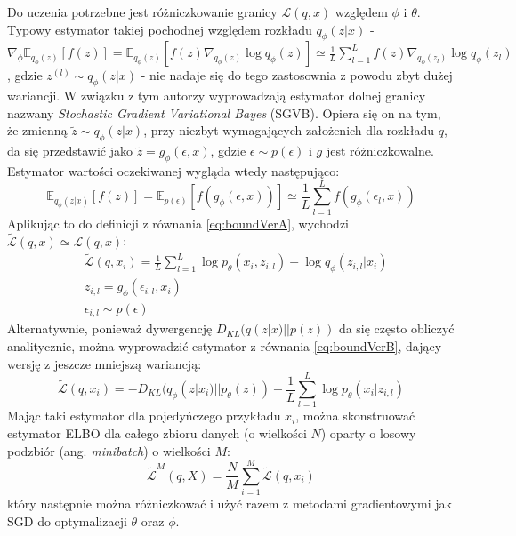 \documentclass[magisterska]{pracamgr}
\begin{document}
Do uczenia potrzebne jest różniczkowanie granicy $\mathcal{L}(q, x)$ względem $\phi$ i $\theta$. Typowy estymator takiej pochodnej względem rozkładu $q_{\phi}(z|x)$ - $\nabla_{\phi} \mathbb{E}_{q_{\phi}(z)}[f(z)] = \mathbb{E}_{q_{\phi}(z)}[f(z) \nabla_{q_{\phi}(z)} \log q_{\phi}(z)] \simeq \frac{1}{L} \sum_{l=1}^{L} f(z) \nabla_{q_{\phi}(z_l)} \log q_{\phi}(z_l)$, gdzie $z^{(l)} \sim q_{\phi}(z|x)$ - nie nadaje się do tego zastosownia z powodu zbyt dużej wariancji. W związku z tym autorzy wyprowadzają estymator dolnej granicy nazwany \textit{Stochastic Gradient Variational Bayes} (SGVB). Opiera się on na tym, że zmienną $\tilde{z} \sim q_{\phi}(z|x)$, przy niezbyt wymagających założenich dla rozkładu $q$, da się przedstawić jako $\tilde{z} = g_{\phi}(\epsilon, x)$, gdzie $\epsilon \sim p(\epsilon)$ i $g$ jest różniczkowalne. Estymator wartości oczekiwanej wygląda wtedy następująco:
\begin{equation}
    \mathbb{E}_{q_{\phi}(z|x)}[f(z)] = \mathbb{E}_{p(\epsilon)}[f(g_{\phi}(\epsilon, x))] \simeq \frac{1}{L} \sum_{l=1}^{L} f(g_{\phi}(\epsilon_l, x))
\end{equation}
Aplikując to do definicji z równania \ref{eq:boundVerA}, wychodzi $\tilde{\mathcal{L}}(q, x) \simeq \mathcal{L}(q, x)$:
\begin{align*}
    & \widetilde{\mathcal{L}}(q, x_i) = \frac{1}{L} \sum\limits_{l=1}^{L} \log p_{\theta}(x_i, z_{i,l}) - \log q_{\phi}(z_{i,l} | x_i) \\
    & z_{i,l} = g_{\phi}(\epsilon_{i,l}, x_i) \\
    & \epsilon_{i, l} \sim p(\epsilon)
\end{align*}
Alternatywnie, ponieważ dywergencję $D_{KL}(q(z|x) || p(z))$ da się często obliczyć analitycznie, można wyprowadzić estymator z równania \ref{eq:boundVerB}, dający wersję z jeszcze mniejszą wariancją:
\begin{equation} \label{eq:vaeloss}
    \widetilde{\mathcal{L}}(q, x_i) = -D_{KL}(q_{\phi}(z|x_i) || p_{\theta}(z)) + \frac{1}{L} \sum\limits_{l=1}^{L} \log p_{\theta}(x_i|z_{i,l})
\end{equation}
Mając taki estymator dla pojedyńczego przykładu $x_i$, można skonstruować estymator ELBO dla całego zbioru danych (o wielkości $N$) oparty o losowy podzbiór (ang. \textit{minibatch}) o wielkości $M$:
\begin{equation}
    \widetilde{\mathcal{L}}^M(q, X) = \frac{N}{M} \sum\limits_{i=1}^{M} \widetilde{\mathcal{L}}(q, x_i)
\end{equation}
który następnie można różniczkować i użyć razem z metodami gradientowymi jak SGD do optymalizacji $\theta$ oraz $\phi$.
\end{document}
